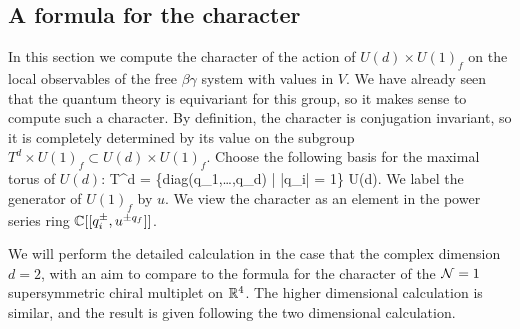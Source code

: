 \documentclass[10pt]{amsart}
\def\brian{\textcolor{blue}{BW: }\textcolor{blue}}
\begin{document}
%
%

\subsection{A formula for the character}

In this section we compute the character of the action of $U(d) \times U(1)_f$ on the local observables of the free $\beta\gamma$ system with values in $V$. 
We have already seen that the quantum theory is equivariant for this group, so it makes sense to compute such a character.
By definition, the character is conjugation invariant, so it is completely determined by its value on the subgroup $T^d \times U(1)_f \subset U(d) \times U(1)_f$. 
Choose the following basis for the maximal torus of $U(d)$: 
\ben
T^d = \{{\rm diag}(q_1,\ldots,q_d) \; | \; |q_i| = 1\} \subset U(d).
\een 
We label the generator of $U(1)_f$ by $u$. 
We view the character as an element in the power series ring $\mathbb C[[q_i^{\pm}, u^{\pm q_f}]]$. 

We will perform the detailed calculation in the case that the complex dimension $d = 2$, with an aim to compare to the formula for the character of the $\mathcal N = 1$ supersymmetric chiral multiplet on $\mathbb R^4$. 
The higher dimensional calculation is similar, and the result is given following the two dimensional calculation.
\end{document}
